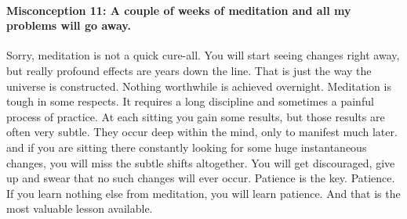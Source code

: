 \paragraph*{Misconception 11: A couple of weeks of meditation and all my problems will go away.} 
Sorry, meditation is not a quick cure-all. You will start seeing changes
right away, but really profound effects are years down the line. That is just
the way the universe is constructed. Nothing worthwhile is achieved overnight.
Meditation is tough in some respects. It requires a long discipline and
sometimes a painful process of practice. At each sitting you gain some results,
but those results are often very subtle. They occur deep within the mind, only
to manifest much later. and if you are sitting there constantly looking for some
huge instantaneous changes, you will miss the subtle shifts altogether. You will
get discouraged, give up and swear that no such changes will ever occur.
Patience is the key. Patience. If you learn nothing else from meditation, you
will learn patience. And that is the most valuable lesson available.
